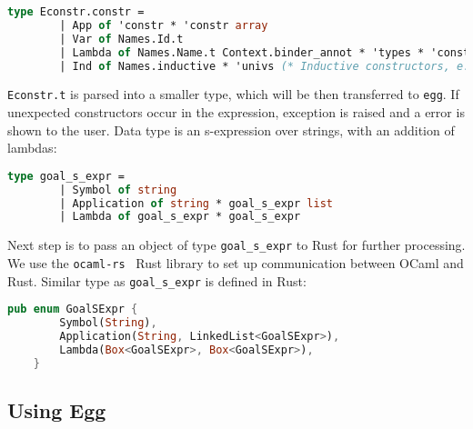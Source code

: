 \vspace{0.5cm}
\begin{lstlisting}[language=ocaml]
    type Econstr.constr = 
        | App of 'constr * 'constr array
        | Var of Names.Id.t
        | Lambda of Names.Name.t Context.binder_annot * 'types * 'constr
        | Ind of Names.inductive * 'univs (* Inductive constructors, e.g. True or False *)
\end{lstlisting}

\texttt{Econstr.t} is parsed into a smaller type, which will be then transferred to \texttt{egg}. If unexpected constructors occur in the expression, exception is raised and a error is shown to the user. Data type is an s-expression over strings, with an addition of lambdas: 

\vspace{0.5cm}
\begin{lstlisting}[language=ocaml]
    type goal_s_expr =
        | Symbol of string
        | Application of string * goal_s_expr list
        | Lambda of goal_s_expr * goal_s_expr
\end{lstlisting}

Next step is to pass an object of type \texttt{goal\_s\_expr} to Rust for further processing. We use the \texttt{ocaml-rs}~\cite{OCaml_rust_ffi} Rust library to set up communication between OCaml and Rust. Similar type as \texttt{goal\_s\_expr} is defined in Rust: 

\vspace{0.5cm}
\begin{lstlisting}[language=rust, style=colouredRust]
    pub enum GoalSExpr {
        Symbol(String),
        Application(String, LinkedList<GoalSExpr>),
        Lambda(Box<GoalSExpr>, Box<GoalSExpr>),
    }
\end{lstlisting}

\subsection{Using Egg}




